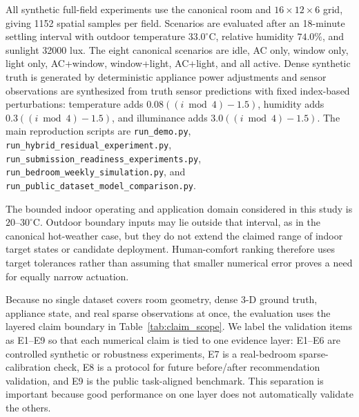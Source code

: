 \documentclass[conference,a4paper]{IEEEtran}
\begin{document}
All synthetic full-field experiments use the canonical room and $16\times12\times6$ grid, giving 1152 spatial samples per field. Scenarios are evaluated after an 18-minute settling interval with outdoor temperature $33.0^\circ$C, relative humidity $74.0\%$, and sunlight 32000 lux. The eight canonical scenarios are idle, AC only, window only, light only, AC+window, window+light, AC+light, and all active. Dense synthetic truth is generated by deterministic appliance power adjustments and sensor observations are synthesized from truth sensor predictions with fixed index-based perturbations: temperature adds $0.08((i\bmod4)-1.5)$, humidity adds $0.3((i\bmod4)-1.5)$, and illuminance adds $3.0((i\bmod4)-1.5)$. The main reproduction scripts are \texttt{run\_demo.py}, \texttt{run\_hybrid\_residual\_experiment.py}, \texttt{run\_submission\_readiness\_experiments.py}, \texttt{run\_bedroom\_weekly\_simulation.py}, and \texttt{run\_public\_dataset\_model\_comparison.py}.

The bounded indoor operating and application domain considered in this study is $20$--$30^\circ$C. Outdoor boundary inputs may lie outside that interval, as in the canonical hot-weather case, but they do not extend the claimed range of indoor target states or candidate deployment. Human-comfort ranking therefore uses target tolerances rather than assuming that smaller numerical error proves a need for equally narrow actuation.

Because no single dataset covers room geometry, dense 3-D ground truth, appliance state, and real sparse observations at once, the evaluation uses the layered claim boundary in Table~\ref{tab:claim_scope}. We label the validation items as E1--E9 so that each numerical claim is tied to one evidence layer: E1--E6 are controlled synthetic or robustness experiments, E7 is a real-bedroom sparse-calibration check, E8 is a protocol for future before/after recommendation validation, and E9 is the public task-aligned benchmark. This separation is important because good performance on one layer does not automatically validate the others.
\end{document}
